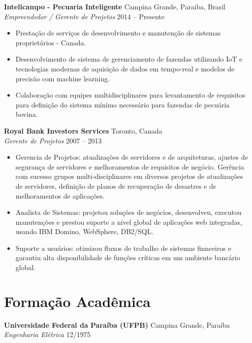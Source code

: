 \documentclass[11pt,a4paper]{article}
\begin{document}
{\bfseries Intelicampo - Pecuaria Inteligente} \hfill Campina Grande, Paraiba, Brasil \\
{\itshape Empreendedor / Gerente de Projetos} \hfill 2014 -- Presente
\begin{itemize}[noitemsep, topsep=2pt]
    \item Prestação de serviços de desenvolvimento e manutenção de sistemas proprietários - Canada.
    \item Desenvolvimento de sistema de gerenciamento de fazendas utilizando IoT e tecnologias modernas de aquisição de dados em tempo-real e modelos de precisão com machine learning.
    \item Colaboração com equipes multidisciplinares para levantamento de requisitos para definição do sistema mínimo necessário para fazendas de pecuária bovina.
\end{itemize}

\vspace{6pt}

{\bfseries Royal Bank Investors Services} \hfill Toronto, Canada \\
{\itshape Gerente de Projetos} \hfill 2007 -- 2013
\begin{itemize}[noitemsep, topsep=2pt]
    \item Gerencia de Projetos: atualizações de servidores e de arquiteturas, ajustes de segurança de servidores e melhoramentos de requisitos de negócio. Gerência com sucesso grupos multi-disciplinares em diversos projetos de atualizações de servidores, definição de planos de recuperação de desastres e de melhoramentos de aplicações.
    \item Analista de Sistemas: projetou soluções de negócios, desenvolveu, executou manutenções e prestou suporte a nivel global de aplicações web integradas, usando IBM Domino, WebSphere,  DB2/SQL. %
    \item Suporte a usuários: otimizou fluxos de trabalho de sistemas finnceiros e garantiu alta disponibilidade de funções críticas em um ambiente bancário global.
\end{itemize}

\section{Formação Acadêmica}

{\bfseries Universidade Federal da Paraíba (UFPB)} \hfill Campina Grande, Paraíba \\
{\itshape Engenharia Elétrica} \hfill 12/1975
\end{document}
